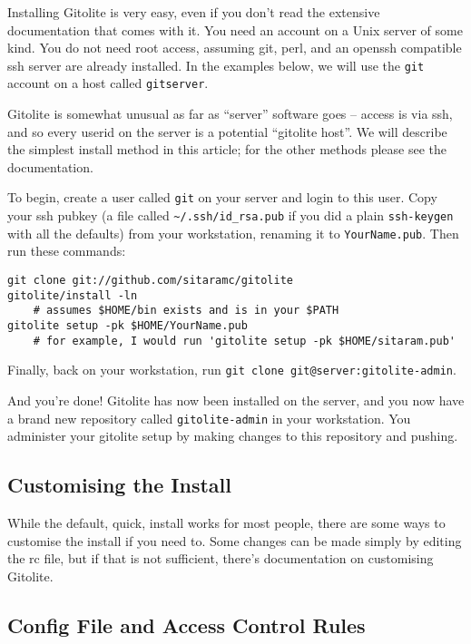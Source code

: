 \documentclass[a4paper]{book}
\begin{document}
Installing Gitolite is very easy, even if you don't read the extensive documentation that comes with it. You need an account on a Unix server of some kind. You do not need root access, assuming git, perl, and an openssh compatible ssh server are already installed. In the examples below, we will use the \texttt{git} account on a host called \texttt{gitserver}.

Gitolite is somewhat unusual as far as “server” software goes -- access is via ssh, and so every userid on the server is a potential “gitolite host”. We will describe the simplest install method in this article; for the other methods please see the documentation.

To begin, create a user called \texttt{git} on your server and login to this user. Copy your ssh pubkey (a file called \texttt{\textasciitilde{}/.ssh/id\_rsa.pub} if you did a plain \texttt{ssh-keygen} with all the defaults) from your workstation, renaming it to \texttt{YourName.pub}. Then run these commands:

\begin{shaded}\begin{verbatim}
git clone git://github.com/sitaramc/gitolite
gitolite/install -ln
    # assumes $HOME/bin exists and is in your $PATH
gitolite setup -pk $HOME/YourName.pub
    # for example, I would run 'gitolite setup -pk $HOME/sitaram.pub'
\end{verbatim}\end{shaded}

Finally, back on your workstation, run \texttt{git clone git@server:gitolite-admin}.

And you're done! Gitolite has now been installed on the server, and you now have a brand new repository called \texttt{gitolite-admin} in your workstation. You administer your gitolite setup by making changes to this repository and pushing.

\subsection{Customising the Install}

While the default, quick, install works for most people, there are some ways to customise the install if you need to. Some changes can be made simply by editing the rc file, but if that is not sufficient, there's documentation on customising Gitolite.

\subsection{Config File and Access Control Rules}
\end{document}
